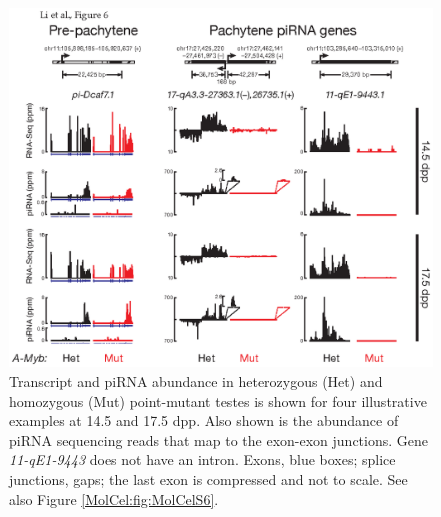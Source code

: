     \begin{figure} %
      \centering 
      \includegraphics{Figures/MolCel/MolCel2013_Fig6.eps}
      \caption[Examples of the Effect of the \amyb{} Mutation on piRNA Expression]
      {
     	 Transcript and piRNA abundance in heterozygous (Het) and homozygous \amyb{} (Mut) point-mutant testes is shown for four illustrative examples at 14.5 and 17.5 dpp. Also shown is the abundance of piRNA sequencing reads that map to the exon-exon junctions. Gene \textit{11-qE1-9443} does not have an intron. Exons, blue boxes; splice junctions, gaps; the last exon is compressed and not to scale. See also Figure \ref{MolCel:fig:MolCelS6}.
     	 }
      \label{MolCel:fig:MolCelF6}
    	\end{figure}
